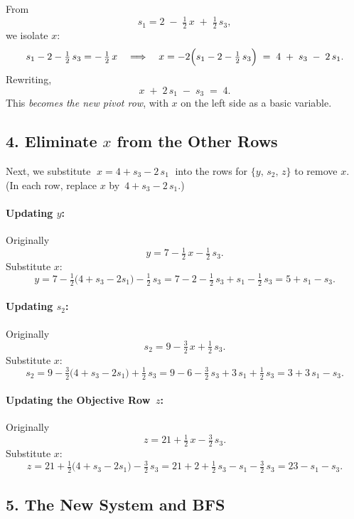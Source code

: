 From
\[
s_1 = 2 \;-\;\tfrac12\,x \;+\;\tfrac12\,s_3,
\]
we isolate \(x\):
\[
s_1 - 2 - \tfrac12\,s_3 = -\,\tfrac12\,x
\quad\Longrightarrow\quad
x = -2\Bigl(s_1 - 2 - \tfrac12\,s_3\Bigr)
\;=\;
4 \;+\; s_3 \;-\; 2\,s_1.
\]
Rewriting,
\[
x \;+\; 2\,s_1 \;-\; s_3 
\;=\;
4.
\]
This \emph{becomes the new pivot row}, with \(x\) on the left side as a basic variable.

\subsection*{4. Eliminate \(x\) from the Other Rows}

Next, we substitute 
\(\;x = 4 + s_3 - 2\,s_1\;\)
into the rows for \(\{y,\,s_2,\,z\}\) to remove \(x\).  
(In each row, replace \(x\) by \(\,4 + s_3 - 2\,s_1\).)

\paragraph{Updating \(y\):}

Originally 
\[
y = 7 - \tfrac12\,x - \tfrac12\,s_3.
\]
Substitute \(x\):
\[
y
= 7 
- \tfrac12\bigl(4 + s_3 - 2s_1\bigr)
- \tfrac12\,s_3
=
7 - 2 - \tfrac12\,s_3 + s_1 - \tfrac12\,s_3
=
5 + s_1 - s_3.
\]

\paragraph{Updating \(s_2\):}

Originally
\[
s_2 = 9 - \tfrac32\,x + \tfrac12\,s_3.
\]
Substitute \(x\):
\[
s_2
= 9 
- \tfrac32\bigl(4 + s_3 - 2s_1\bigr)
+ \tfrac12\,s_3
= 
9 - 6 - \tfrac32\,s_3 + 3\,s_1 + \tfrac12\,s_3
=
3 + 3\,s_1 - s_3.
\]

\paragraph{Updating the Objective Row \(\,z\):}

Originally
\[
z = 21 + \tfrac12\,x - \tfrac32\,s_3.
\]
Substitute \(x\):
\[
z
= 
21 
+ \tfrac12\bigl(4 + s_3 - 2s_1\bigr)
- \tfrac32\,s_3
=
21 + 2 + \tfrac12\,s_3 - s_1 - \tfrac32\,s_3
=
23 - s_1 - s_3.
\]

\subsection*{5. The New System and BFS}

